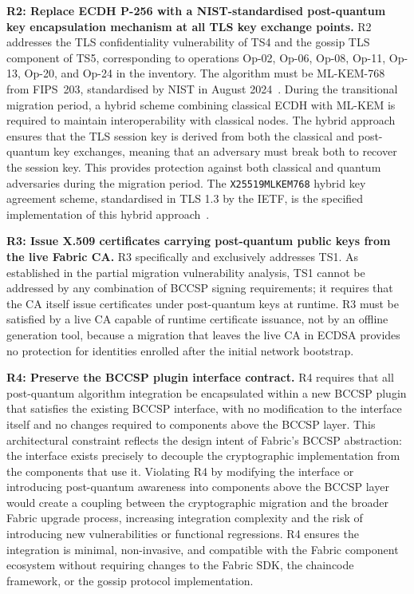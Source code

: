 \documentclass[conference]{IEEEtran}
\begin{document}
\textbf{R2: Replace ECDH P-256 with a NIST-standardised post-quantum key
encapsulation mechanism at all TLS key exchange points.}
R2 addresses the TLS confidentiality vulnerability of TS4 and the gossip
TLS component of TS5, corresponding to operations Op-02, Op-06, Op-08,
Op-11, Op-13, Op-20, and Op-24 in the inventory. The algorithm must be
ML-KEM-768 from FIPS~203, standardised by NIST in August
2024~\cite{nist_fips203}. During the transitional migration period, a
hybrid scheme combining classical ECDH with ML-KEM is required to maintain
interoperability with classical nodes. The hybrid approach ensures that
the TLS session key is derived from both the classical and post-quantum
key exchanges, meaning that an adversary must break both to recover the
session key. This provides protection against both classical and quantum
adversaries during the migration period. The \texttt{X25519MLKEM768}
hybrid key agreement scheme, standardised in TLS 1.3 by the IETF, is the
specified implementation of this hybrid approach~\cite{ietf_hybrid_tls}.

\textbf{R3: Issue X.509 certificates carrying post-quantum public keys
from the live Fabric CA.}
R3 specifically and exclusively addresses TS1. As established in the
partial migration vulnerability analysis, TS1 cannot be addressed by any
combination of BCCSP signing requirements; it requires that the CA itself
issue certificates under post-quantum keys at runtime. R3 must be
satisfied by a live CA capable of runtime certificate issuance, not by
an offline generation tool, because a migration that leaves the live CA
in ECDSA provides no protection for identities enrolled after the initial
network bootstrap.

\textbf{R4: Preserve the BCCSP plugin interface contract.}
R4 requires that all post-quantum algorithm integration be encapsulated
within a new BCCSP plugin that satisfies the existing BCCSP interface,
with no modification to the interface itself and no changes required to
components above the BCCSP layer. This architectural constraint reflects
the design intent of Fabric's BCCSP abstraction: the interface exists
precisely to decouple the cryptographic implementation from the components
that use it. Violating R4 by modifying the interface or introducing
post-quantum awareness into components above the BCCSP layer would create
a coupling between the cryptographic migration and the broader Fabric
upgrade process, increasing integration complexity and the risk of
introducing new vulnerabilities or functional regressions. R4 ensures the
integration is minimal, non-invasive, and compatible with the Fabric
component ecosystem without requiring changes to the Fabric SDK, the
chaincode framework, or the gossip protocol implementation.
\end{document}
